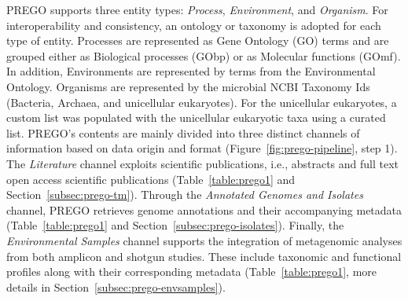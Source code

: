    PREGO supports three entity types: \textit{Process}, \textit{Environment}, and \textit{Organism}. 
   For interoperability and consistency, an ontology or taxonomy is adopted for each type of entity.
   Processes are represented as Gene Ontology (GO) terms and are grouped either as Biological processes (GObp) or as Molecular functions (GOmf). 
   In addition, Environments are represented by terms from the Environmental Ontology. 
   Organisms are represented by the microbial NCBI Taxonomy Ids (Bacteria, Archaea, and unicellular eukaryotes). For the unicellular eukaryotes, a custom list was populated with the unicellular eukaryotic taxa using a curated list.
   PREGO's contents are mainly divided into three distinct channels of information based on data origin and format (Figure~\ref{fig:prego-pipeline}, step 1). 
   The \textit{Literature} channel exploits scientific publications, i.e., abstracts and full text open access scientific publications (Table~\ref{table:prego1} and Section~\ref{subsec:prego-tm}). 
   Through the \textit{Annotated Genomes and Isolates} channel, PREGO retrieves genome annotations and their accompanying metadata (Table~\ref{table:prego1} and Section~\ref{subsec:prego-isolates}). 
   Finally, the \textit{Environmental Samples} channel supports the integration of metagenomic analyses from both amplicon and shotgun studies. 
   These include taxonomic and functional profiles along with their corresponding metadata (Table~\ref{table:prego1}, more details in Section~\ref{subsec:prego-envsamples}).


